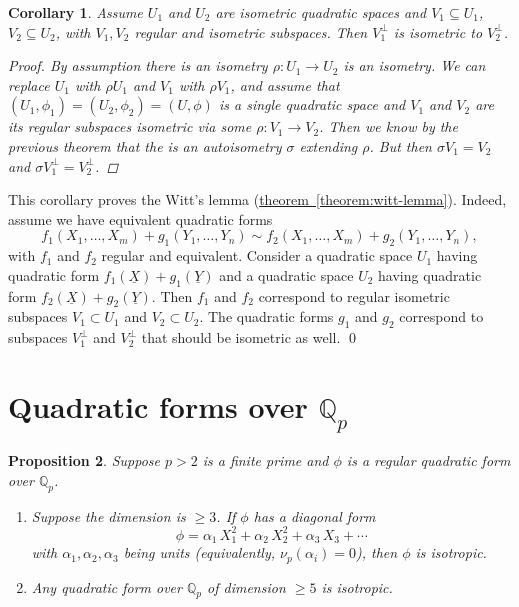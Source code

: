 \documentclass{article}
\newcommand{\QQ}{\mathbb{Q}}
\newcommand{\refref}[2]{\hyperref[#2]{#1~\ref*{#2}}}
\theoremstyle{myplain}
\newtheorem{proposition}{Proposition}[section]
\newtheorem{corollary}[proposition]{Corollary}
\theoremstyle{mydefinition}
\begin{document}
\begin{corollary}
  Assume $U_1$ and $U_2$ are isometric quadratic spaces and $V_1 \subseteq U_1$,
  $V_2 \subseteq U_2$, with $V_1,V_2$ regular and isometric subspaces. Then
  $V_1^\perp$ is isometric to $V_2^\perp$.

  \begin{proof}
    By assumption there is an isometry $\rho\colon U_1\to U_2$ is an
    isometry. We can replace $U_1$ with $\rho U_1$ and $V_1$ with $\rho V_1$,
    and assume that $(U_1,\phi_1) = (U_2,\phi_2) = (U,\phi)$ is a single
    quadratic space and $V_1$ and $V_2$ are its regular subspaces isometric via
    some $\rho\colon V_1\to V_2$. Then we know by the previous theorem that the
    is an autoisometry $\sigma$ extending $\rho$. But then $\sigma V_1 = V_2$
    and $\sigma V_1^\perp = V_2^\perp$.
  \end{proof}
\end{corollary}

This corollary proves the Witt's lemma
(\refref{theorem}{theorem:witt-lemma}). Indeed, assume we have equivalent
quadratic forms
$$f_1 (X_1, \ldots, X_m) + g_1 (Y_1,\ldots,Y_n) \sim f_2 (X_1, \ldots, X_m) + g_2 (Y_1,\ldots,Y_n),$$
with $f_1$ and $f_2$ regular and equivalent. Consider a quadratic space $U_1$
having quadratic form $f_1 (\underline{X}) + g_1 (\underline{Y})$ and a
quadratic space $U_2$ having quadratic form
$f_2 (\underline{X}) + g_2 (\underline{Y})$. Then $f_1$ and $f_2$ correspond to
regular isometric subspaces $V_1 \subset U_1$ and $V_2 \subset U_2$. The
quadratic forms $g_1$ and $g_2$ correspond to subspaces $V_1^\perp$ and
$V_2^\perp$ that should be isometric as well. \qed

\section{Quadratic forms over $\QQ_p$}

\begin{proposition}\label{proposition:units-isotropic}
  Suppose $p > 2$ is a finite prime and $\phi$ is a regular quadratic form over
  $\QQ_p$.

  \begin{enumerate}
  \item Suppose the dimension is $\ge 3$. If $\phi$ has a diagonal form
    $$\phi = \alpha_1\,X_1^2 + \alpha_2\,X_2^2 + \alpha_3\,X_3 + \cdots$$
    with $\alpha_1, \alpha_2, \alpha_3$ being units (equivalently,
    $ \nu_p (\alpha_i) = 0$), then $\phi$ is isotropic.

  \item Any quadratic form over $\QQ_p$ of dimension $\ge 5$ is isotropic.
  \end{enumerate}
\end{proposition}
\end{document}
